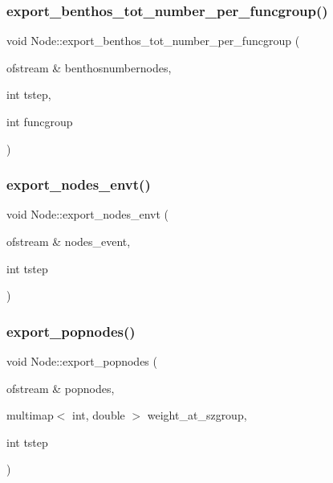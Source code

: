 \subsubsection{\texorpdfstring{export\_benthos\_tot\_number\_per\_funcgroup()}{export\_benthos\_tot\_number\_per\_funcgroup()}}
{\footnotesize\ttfamily void Node\+::export\+\_\+benthos\+\_\+tot\+\_\+number\+\_\+per\+\_\+funcgroup (\begin{DoxyParamCaption}\item[{ofstream \&}]{benthosnumbernodes,  }\item[{int}]{tstep,  }\item[{int}]{funcgroup }\end{DoxyParamCaption})}

\mbox{\label{class_node_a9e8afa02d6c6c090a18335770644de00}} 
\subsubsection{\texorpdfstring{export\_nodes\_envt()}{export\_nodes\_envt()}}
{\footnotesize\ttfamily void Node\+::export\+\_\+nodes\+\_\+envt (\begin{DoxyParamCaption}\item[{ofstream \&}]{nodes\+\_\+event,  }\item[{int}]{tstep }\end{DoxyParamCaption})}

\mbox{\label{class_node_aa97423b8f06b5a82eafa9244c8e72997}} 
\subsubsection{\texorpdfstring{export\_popnodes()}{export\_popnodes()}}
{\footnotesize\ttfamily void Node\+::export\+\_\+popnodes (\begin{DoxyParamCaption}\item[{ofstream \&}]{popnodes,  }\item[{multimap$<$ int, double $>$}]{weight\+\_\+at\+\_\+szgroup,  }\item[{int}]{tstep }\end{DoxyParamCaption})}

\mbox{\label{class_node_a65ff7a08e7934016e630e83a8f5f27c3}} 
